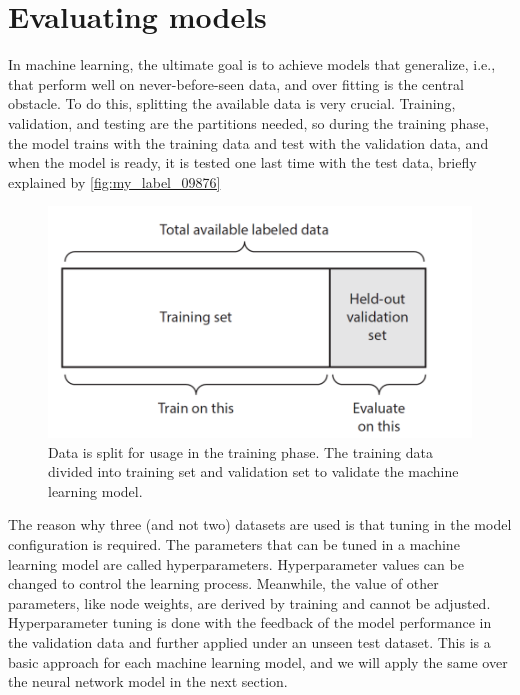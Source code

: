 \section{Evaluating models}
In machine learning, the ultimate goal is to achieve models that generalize, i.e., that perform well on never-before-seen data, and over fitting is the central obstacle. To do this, splitting the available data is very crucial. Training, validation, and testing are the partitions  
needed, so during the training phase, the model trains with the training data and test with the validation data, and when the model is ready, it is tested one last time with the test data, briefly explained by \autoref{fig:my_label_09876} \\
\begin{figure}[H]
    \centering
    \includegraphics[scale=0.6]{Figure/ml__12.png}
    \caption{Data is split for usage in the training phase\cite{10.5555/3203489}. The training data divided into training set and validation set to validate the machine learning model.}
    \label{fig:my_label_09876}
\end{figure}
The reason why three (and not two) datasets are used is that tuning in the model configuration is required. The parameters that can be tuned in a machine learning model are called hyperparameters\cite{https://doi.org/10.48550/arxiv.1904.11829,https://doi.org/10.48550/arxiv.1412.3555}. Hyperparameter values can be changed to control the learning process. Meanwhile, the value of other parameters, like node weights, are derived by training and cannot be adjusted. Hyperparameter tuning is done with the feedback of the model performance in the validation data and further applied under an unseen test dataset. This is a basic approach for each machine learning model, and we will apply the same over the neural network model in the next section.

